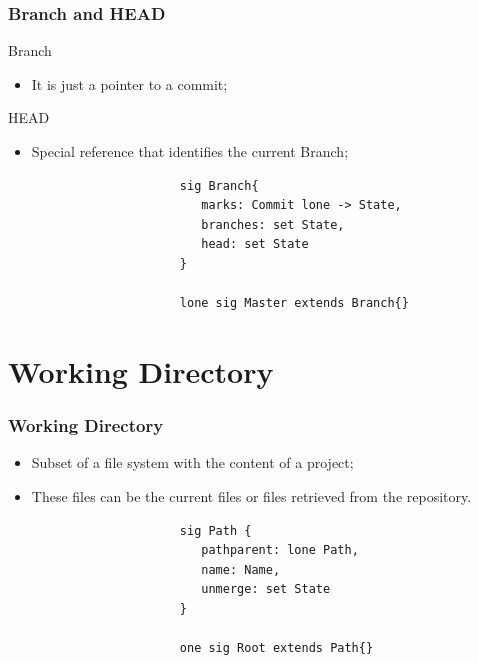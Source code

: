 \documentclass{beamer}
\begin{document}
\begin{frame}[fragile]
\frametitle{Branch and HEAD}
   \begin{block}{Branch}
      \begin{itemize}
         \item It is just a pointer to a commit;
      \end{itemize}
   \end{block}
   \begin{block}{HEAD}
      \begin{itemize} 
         \item Special reference that identifies the current Branch;
      \end{itemize}
   \end{block}
   \tiny
   \color{blue}
   \begin{lstlisting}
                        sig Branch{
                           marks: Commit lone -> State,
                           branches: set State,
                           head: set State
                        }

                        lone sig Master extends Branch{}
   \end{lstlisting}
\end{frame}


\section{Working Directory}
\begin{frame}[fragile]
   \frametitle{Working Directory}
   \begin{itemize}
      \item Subset of a file system with the content of a project;
      \item These files can be the current files or files retrieved
      from the repository.
   \end{itemize}
   \tiny
   \color{blue}
   \begin{lstlisting}
                        sig Path {
                           pathparent: lone Path,
                           name: Name,
                           unmerge: set State
                        }

                        one sig Root extends Path{}
   \end{lstlisting}
\end{frame}
\end{document}
